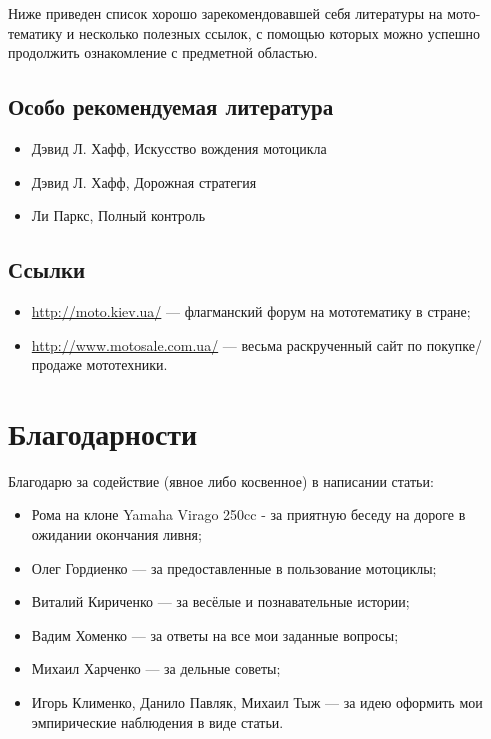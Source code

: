 \documentclass[12pt,a4paper]{article}
\begin{document}
Ниже приведен список хорошо зарекомендовавшей себя литературы на
мото-тематику и несколько полезных ссылок, с помощью которых можно
успешно продолжить ознакомление с предметной областью.

\subsection{Особо рекомендуемая литература}

\begin{itemize}
\item Дэвид Л. Хафф, Искусство вождения мотоцикла
\item Дэвид Л. Хафф, Дорожная стратегия
\item Ли Паркс, Полный контроль
\end{itemize}

\subsection{Ссылки}

\begin{itemize}
\item \url{http://moto.kiev.ua/} --- флагманский форум на мототематику в стране;
\item \url{http://www.motosale.com.ua/} --- весьма раскрученный сайт по покупке/продаже мототехники.
\end{itemize}

\clearpage

\section{Благодарности}

Благодарю за содействие (явное либо косвенное) в написании статьи:

\begin{itemize}
\item Рома на клоне Yamaha Virago 250cc - за приятную беседу на дороге
в ожидании окончания ливня;
\item Олег Гордиенко --- за предоставленные в пользование мотоциклы;
\item Виталий Кириченко --- за весёлые и познавательные истории;
\item Вадим Хоменко --- за ответы на все мои заданные вопросы;
\item Михаил Харченко --- за дельные советы;
\item Игорь Клименко, Данило Павляк, Михаил Тыж --- за идею оформить
мои эмпирические наблюдения в виде статьи.
\end{itemize}
\end{document}
